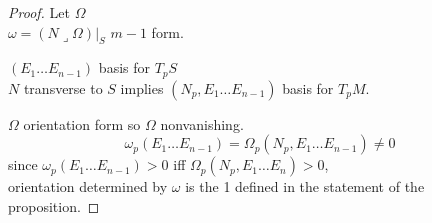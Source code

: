 \documentclass[11pt]{amsart}
\theoremstyle{definition}
\begin{document}
\begin{proof} Let $\Omega$ \\
\phantom{proof Let } $\omega  = \left. (N \mathbin{\lrcorner} \Omega) \right|_S$ $m-1$ form.

$(E_1 \dots E_{n-1}) $ basis for $T_pS$ \\
$N$ transverse to $S$ implies $(N_p, E_1 \dots E_{n-1})$ basis for $T_pM$.

$\Omega$ orientation form so $\Omega$ nonvanishing.
\[
\omega_p(E_1 \dots E_{n-1}) = \Omega_p(N_p, E_1 \dots E_{n-1}) \neq 0
\]
since $\omega_p(E_1 \dots E_{n-1}) >0$ iff $\Omega_p(N_p, E_1 \dots E_n) >0$,  \\
orientation determined by $\omega$ is the 1 defined in the statement of the proposition.

\end{proof}
\end{document}
